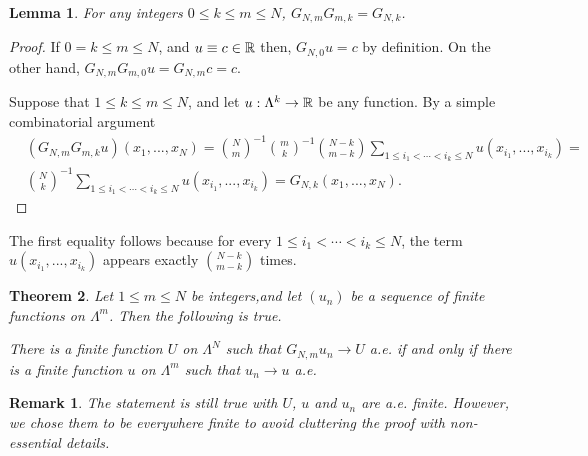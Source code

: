 \documentclass[12pt,leqno]{amsart}
\newtheorem{theor}{Theorem}[section]{\bf}{\it}
\newtheorem{lem}[theor]{Lemma}{\bf}{\it}
\newtheorem{rem}{Remark}[section]{\bf}{\rm}
\numberwithin{equation}{section}
\numberwithin{theor}{section}
\numberwithin{rem}{section}
\begin{document}
\begin{lem}
\label{Lem2}
For any integers $0\leq k\leq m\leq N$, $G_{N,m} G_{m,k}=
G_{N,k}$.  
\end{lem}
\begin{proof}
If $0=k\leq m\leq N$, and $u\equiv c\in \Bbb{R}$ then,
$G_{N,0}u=c$ by definition.  On the other hand, 
$G_{N,m}G_{m,0}u=G_{N,m} c = c$. 

Suppose that $1\leq k\leq m\leq N$, and let $u:\Lambda^k\rightarrow \Bbb{R}$ be any function.  By a simple 
combinatorial argument 
\begin{equation}
\begin{split}
&\left(G_{N,m}G_{m,k} u\right )(x_1,...,x_N)=
\binom{N}{m}^{-1}\binom{m}{k}^{-1}\binom{N-k}{m-k}
\sum_{1\leq i_1<\cdots<i_k\leq N} u(x_{i_1},...,x_{i_k})=\\
&\binom{N}{k}^{-1}\sum_{1\leq i_1<\cdots<i_k\leq N} u(x_{i_1},...,x_{i_k})=G_{N,k}(x_1,...,x_N).
\end{split}
\end{equation}
\end{proof}
The first equality follows because for every $1\leq i_1<\cdots<i_k\leq N$, the term $u(x_{i_1},...,x_{i_k})$ appears 
exactly $\binom{N-k}{m-k}$ times.  
\begin{theor}
\label{Theor1}
Let $1\leq m\leq N$ be integers,and let $(u_n)$ be a 
sequence of finite functions on $\Lambda^m$.  Then the 
following is true.  

There is a finite function $U$ on $\Lambda^N$ such that 
$G_{N,m} u_n\rightarrow U$ a.e. if and only if there is 
a finite function $u$ on $\Lambda^m$ such that 
$u_n\rightarrow u$ a.e.  
\end{theor}
\begin{rem}
\rm{The statement is still true with $U$, $u$ and $u_n$ are a.e. finite.  However, we chose them to be everywhere finite to avoid cluttering the proof with non-essential details.}
\end{rem}
\end{document}

